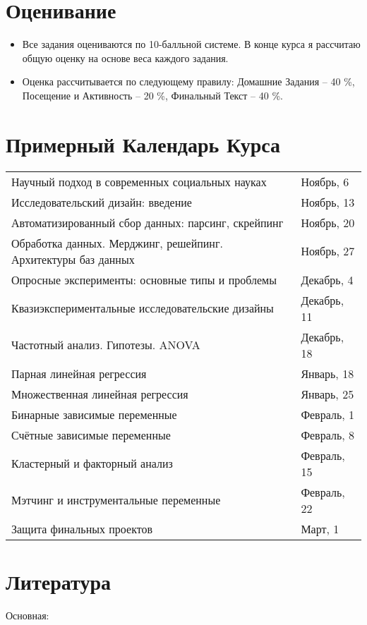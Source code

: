 \documentclass[12pt]{article}
\begin{document}
\section*{Оценивание}
\begin{itemize}
\item Все задания оцениваются по 10-балльной системе. В конце курса я рассчитаю общую оценку на основе веса каждого задания.
\item Оценка рассчитывается по следующему правилу: Домашние Задания -- 40 \%,  Посещение и Активность -- 20 \%,  Финальный Текст -- 40 \%.  
\end{itemize}
\section*{Примерный Календарь Курса}
\begin{table}[H]
\begin{tabular}{p{}@{}p{}@{}}
Научный подход в современных социальных науках \dotfill & Ноябрь, 6 \\ 
Исследовательский дизайн: введение \dotfill & Ноябрь, 13 \\
Автоматизированный сбор данных: парсинг, скрейпинг \dotfill & Ноябрь, 20 \\
Обработка данных. Мерджинг, решейпинг. Архитектуры баз данных \dotfill & Ноябрь, 27 \\
Опросные эксперименты: основные типы и проблемы \dotfill & Декабрь, 4 \\
Квазиэкспериментальные исследовательские дизайны \dotfill & Декабрь, 11 \\
Частотный анализ. Гипотезы. ANOVA \dotfill & Декабрь, 18 \\
Парная линейная регрессия  \dotfill & Январь, 18 \\
Множественная линейная регрессия \dotfill & Январь, 25 \\
Бинарные зависимые переменные \dotfill & Февраль, 1 \\
Счётные зависимые переменные \dotfill & Февраль, 8 \\
Кластерный и факторный анализ \dotfill & Февраль, 15 \\
Мэтчинг и инструментальные переменные \dotfill & Февраль, 22 \\
Защита финальных проектов \dotfill & Март, 1
\end{tabular}
\end{table}
\section*{Литература}
Основная:
\end{document}
